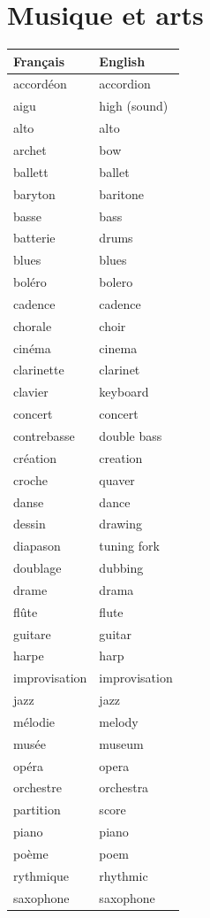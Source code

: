 \documentclass[12pt,a4paper]{article}
\begin{document}
\section{Musique et arts}
\begin{longtable}{p{4cm} p{6cm}}
\toprule
\textbf{Français} & \textbf{English} \\
\midrule
accordéon & accordion \\
aigu & high (sound) \\
alto & alto \\
archet & bow \\
ballett & ballet \\
baryton & baritone \\
basse & bass \\
batterie & drums \\
blues & blues \\
boléro & bolero \\
cadence & cadence \\
chorale & choir \\
cinéma & cinema \\
clarinette & clarinet \\
clavier & keyboard \\
concert & concert \\
contrebasse & double bass \\
création & creation \\
croche & quaver \\
danse & dance \\
dessin & drawing \\
diapason & tuning fork \\
doublage & dubbing \\
drame & drama \\
flûte & flute \\
guitare & guitar \\
harpe & harp \\
improvisation & improvisation \\
jazz & jazz \\
mélodie & melody \\
musée & museum \\
opéra & opera \\
orchestre & orchestra \\
partition & score \\
piano & piano \\
poème & poem \\
rythmique & rhythmic \\
saxophone & saxophone \\

\end{longtable}
\end{document}
